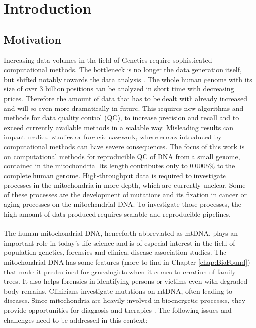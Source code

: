 \chapter{Introduction}
\label{chapterIntro}
\section{Motivation}
Increasing data volumes in the field of Genetics require sophisticated computational methods. The bottleneck is no longer the data generation itself, but shifted notably towards the data analysis \cite{Forer2014}. The whole human genome with its size of over 3 billion positions can be analyzed in short time with decreasing prices. Therefore the amount of data that has to be dealt with already increased and will so even more dramatically in future. This requires new algorithms and methods for data quality control (QC), to  increase precision and recall and to exceed currently available methods in a scalable way. Misleading results can impact medical studies or forensic casework, where errors introduced by computational methods can have severe consequences. The focus of this work is on computational methods for reproducible QC of DNA from a small genome, contained in the mitochondria. Its length contributes only to $0.0005\%$ to the complete human genome. High-throughput data is required to investigate processes in the mitochondria in more depth, which are currently unclear. Some of these processes are the development of mutations and its fixation in cancer or aging processes on the mitochondrial DNA. To investigate those processes, the high amount of data produced   requires scalable and reproducible pipelines. 
\\
\\
The human mitochondrial DNA, henceforth abbreviated as mtDNA, plays an important role in today's life-science and is of especial interest in the field of population genetics, forensics and clinical disease association studies. The mitochondrial DNA has some features (more to find in Chapter \ref{chap:BioFound}) that make it predestined for genealogists when it comes to creation of family trees. It also helps forensics in identifying persons or victims even with degraded body remains. Clinicians investigate mutations on mtDNA, often leading to diseases. Since mitochondria are heavily involved in bioenergetic processes, they provide opportunities for diagnosis and therapies \cite{Picard2016}.
The following issues and challenges need to be addressed in this context:
